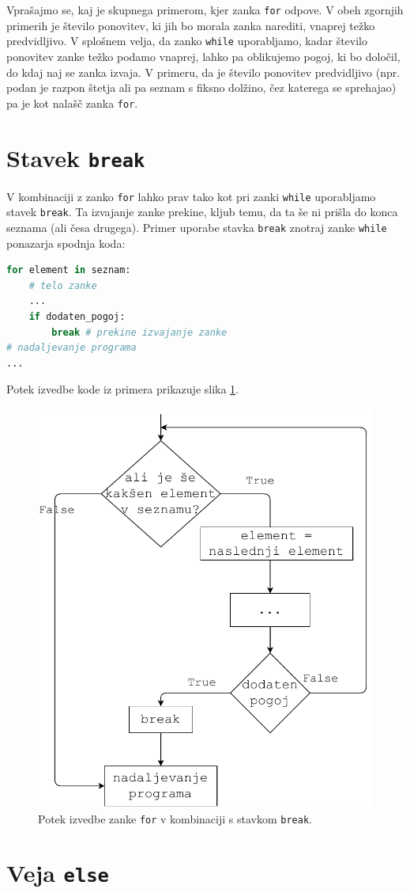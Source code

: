 Vprašajmo se, kaj je skupnega primerom, kjer zanka \texttt{for} odpove. V obeh zgornjih primerih je število ponovitev, ki jih bo morala zanka narediti, vnaprej težko predvidljivo. V splošnem velja, da zanko \texttt{while} uporabljamo, kadar število ponovitev zanke težko podamo vnaprej, lahko pa oblikujemo pogoj, ki bo določil, do kdaj naj se zanka izvaja. V primeru, da je število ponovitev predvidljivo (npr. podan je razpon štetja ali pa seznam s fiksno dolžino, čez katerega se sprehajao) pa je kot nalašč zanka \texttt{for}.

\section{Stavek \texttt{break}}

V kombinaciji z zanko \texttt{for} lahko prav tako kot pri zanki \texttt{while} uporabljamo stavek \texttt{break}. Ta izvajanje zanke prekine, kljub temu, da ta še ni prišla do konca seznama (ali česa drugega). Primer uporabe stavka \texttt{break} znotraj zanke \texttt{while} ponazarja spodnja koda:
\begin{lstlisting}[language=Python, showstringspaces=false]
for element in seznam:
    # telo zanke
    ...
    if dodaten_pogoj: 
        break # prekine izvajanje zanke
# nadaljevanje programa
...
\end{lstlisting}
Potek izvedbe kode iz primera prikazuje slika \ref{img:for2}.
\begin{figure}
    \centering
    \includegraphics[width=0.5\linewidth]{img/for2.pdf}
    \caption{Potek izvedbe zanke \texttt{for} v kombinaciji s stavkom \texttt{break}.}
    \label{img:for2}
\end{figure}


\section{Veja \texttt{else}}

